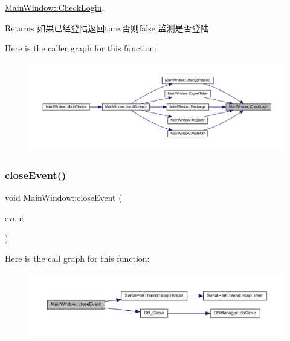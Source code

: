 \mbox{\hyperlink{class_main_window_add9eeb672a0e00eb427170f1367b2281}{Main\+Window\+::\+Check\+Login}}. 

\begin{DoxyReturn}{Returns}
如果已经登陆返回ture,否则false 监测是否登陆 
\end{DoxyReturn}
Here is the caller graph for this function\+:
\nopagebreak
\begin{figure}[H]
\begin{center}
\leavevmode
\includegraphics[width=350pt]{class_main_window_add9eeb672a0e00eb427170f1367b2281_icgraph}
\end{center}
\end{figure}
\mbox{\label{class_main_window_a4e20a4a065fbb0e4d3532a45a0a91425}} 
\subsubsection{\texorpdfstring{closeEvent()}{closeEvent()}}
{\footnotesize\ttfamily void Main\+Window\+::close\+Event (\begin{DoxyParamCaption}\item[{Q\+Close\+Event $\ast$}]{event }\end{DoxyParamCaption})\hspace{0.3cm}{\ttfamily [protected]}}

Here is the call graph for this function\+:
\nopagebreak
\begin{figure}[H]
\begin{center}
\leavevmode
\includegraphics[width=350pt]{class_main_window_a4e20a4a065fbb0e4d3532a45a0a91425_cgraph}
\end{center}
\end{figure}
\mbox{\label{class_main_window_a24ffccc8ae4041a33faa25844a3db1f8}} 
